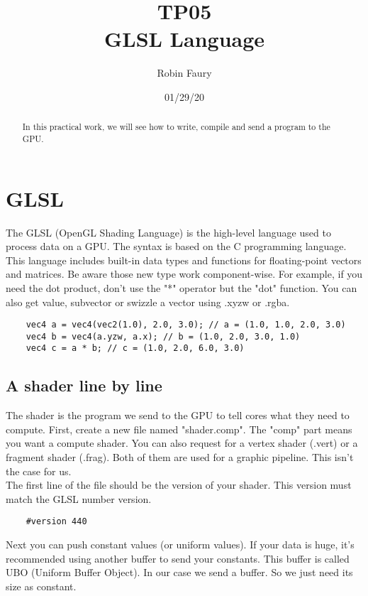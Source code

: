 \documentclass{article}
\begin{document}
\title{TP05\\GLSL Language}
\author{Robin Faury}
\date{01/29/20}
\maketitle

\begin{abstract}
	In this practical work, we will see how to write, compile and send a program to the GPU.
\end{abstract}

\section{GLSL}
The GLSL (OpenGL Shading Language) is the high-level language used to process data on a GPU. The syntax is based on the C programming language. This language includes built-in data types and functions for floating-point vectors and matrices. Be aware those new type work component-wise. For example, if you need the dot product, don't use the "*" operator but the "dot" function. You can also get value, subvector or swizzle a vector using .xyzw or .rgba.
\begin{lstlisting}
	vec4 a = vec4(vec2(1.0), 2.0, 3.0); // a = (1.0, 1.0, 2.0, 3.0)
	vec4 b = vec4(a.yzw, a.x); // b = (1.0, 2.0, 3.0, 1.0)
	vec4 c = a * b; // c = (1.0, 2.0, 6.0, 3.0)
\end{lstlisting}

\subsection{A shader line by line}
The shader is the program we send to the GPU to tell cores what they need to compute. First, create a new file named "shader.comp". The "comp" part means you want a compute shader. You can also request for a vertex shader (.vert) or a fragment shader (.frag). Both of them are used for a graphic pipeline. This isn't the case for us.\\
The first line of the file should be the version of your shader. This version must match the GLSL number version.

\begin{lstlisting}
	#version 440
\end{lstlisting}

Next you can push constant values (or uniform values). If your data is huge, it's recommended using another buffer to send your constants. This buffer is called UBO (Uniform Buffer Object). In our case we send a buffer. So we just need its size as constant.
\end{document}
